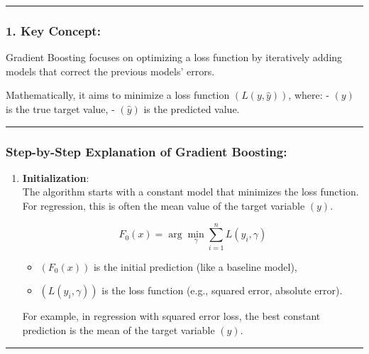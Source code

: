 \documentclass[12pt]{book}
\providecommand{\tightlist}{%
  \setlength{\itemsep}{0pt}\setlength{\parskip}{0pt}}
\begin{document}
\begin{center}\rule{0.5\linewidth}{0.5pt}\end{center}

\subsubsection{\texorpdfstring{1. \textbf{Key
Concept}:}{1. Key Concept:}}\label{key-concept}

Gradient Boosting focuses on optimizing a loss function by iteratively
adding models that correct the previous models' errors.

Mathematically, it aims to minimize a loss function
\(( L(y, \hat{y}) )\), where: - \(( y )\) is the true target value, -
\(( \hat{y} )\) is the predicted value.

\begin{center}\rule{0.5\linewidth}{0.5pt}\end{center}

\subsubsection{Step-by-Step Explanation of Gradient
Boosting:}\label{step-by-step-explanation-of-gradient-boosting}

\begin{enumerate}
\def\labelenumi{\arabic{enumi}.}
\item
  \textbf{Initialization}:\\
  The algorithm starts with a constant model that minimizes the loss
  function. For regression, this is often the mean value of the target
  variable \(( y )\).

  \[
  F_0(x) = \arg \min_{\gamma} \sum_{i=1}^{n} L(y_i, \gamma)
  \]

  \begin{itemize}
  \tightlist
  \item
    \(( F_0(x) )\) is the initial prediction (like a baseline model),
  \item
    \(( L(y_i, \gamma) )\) is the loss function (e.g., squared error,
    absolute error).
  \end{itemize}

  For example, in regression with squared error loss, the best constant
  prediction is the mean of the target variable \(( y )\).
\end{enumerate}

\begin{center}\rule{0.5\linewidth}{0.5pt}\end{center}
\end{document}
